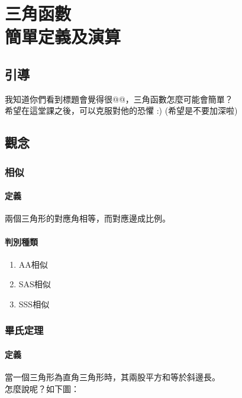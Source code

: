 \chapter{三角函數\\簡單定義及演算}

\setcounter{section}{-1}
\section{引導}
我知道你們看到標題會覺得很@@，三角函數怎麼可能會簡單？ \\
希望在這堂課之後，可以克服對他的恐懼 :) (希望是不要加深啦)

\section{觀念}
\subsection{相似}
\subsubsection{定義}
兩個三角形的對應角相等，而對應邊成比例。

\subsubsection{判別種類}
\begin{enumerate}
\item AA相似
\item SAS相似
\item SSS相似
\end{enumerate}

\subsection{畢氏定理}
\subsubsection{定義}
當一個三角形為直角三角形時，其兩股平方和等於斜邊長。 \\
怎麼說呢？如下圖： \\

